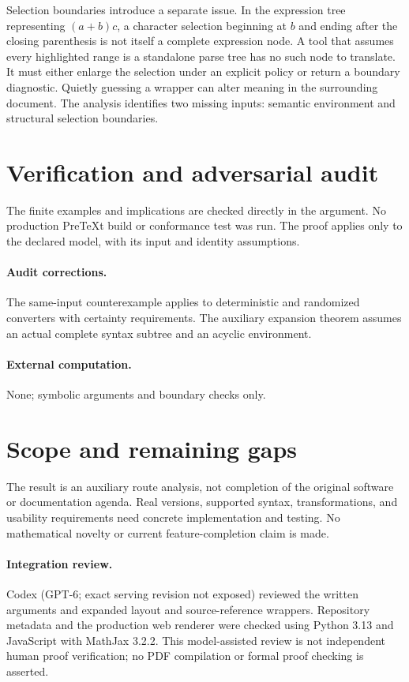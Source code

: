 \documentclass[11pt]{article}
\begin{document}
Selection boundaries introduce a separate issue. In the expression tree representing $(a+b)c$, a character selection beginning at $b$ and ending after the closing parenthesis is not itself a complete expression node. A tool that assumes every highlighted range is a standalone parse tree has no such node to translate. It must either enlarge the selection under an explicit policy or return a boundary diagnostic. Quietly guessing a wrapper can alter meaning in the surrounding document. The analysis identifies two missing inputs: semantic environment and structural selection boundaries.
\section{Verification and adversarial audit}
The finite examples and implications are checked directly in the argument. No production PreTeXt build or conformance test was run. The proof applies only to the declared model, with its input and identity assumptions.
\paragraph{Audit corrections.} The same-input counterexample applies to deterministic and randomized converters with certainty requirements. The auxiliary expansion theorem assumes an actual complete syntax subtree and an acyclic environment.
\paragraph{External computation.} None; symbolic arguments and boundary checks only.
\section{Scope and remaining gaps}
The result is an auxiliary route analysis, not completion of the original software or documentation agenda. Real versions, supported syntax, transformations, and usability requirements need concrete implementation and testing. No mathematical novelty or current feature-completion claim is made.
\paragraph{Integration review.} Codex (GPT-6; exact serving revision not exposed) reviewed the written arguments and expanded layout and source-reference wrappers. Repository metadata and the production web renderer were checked using Python 3.13 and JavaScript with MathJax 3.2.2. This model-assisted review is not independent human proof verification; no PDF compilation or formal proof checking is asserted.
\end{document}
